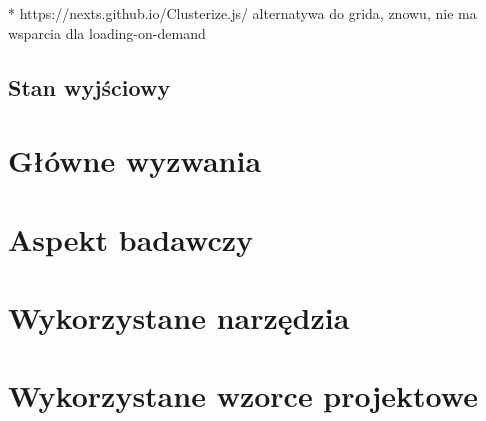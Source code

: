 * https://nexts.github.io/Clusterize.js/
alternatywa do grida, znowu, nie ma wsparcia dla loading-on-demand
\subsection{Stan wyjściowy}

\section{Główne wyzwania}
\section{Aspekt badawczy}
\section{Wykorzystane narzędzia}
\section{Wykorzystane wzorce projektowe}
